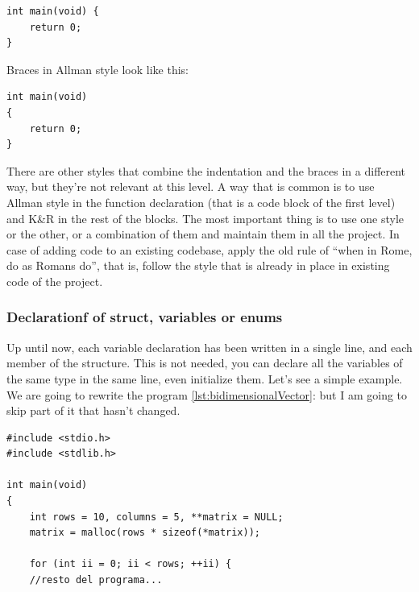 \documentclass[a4paper]{article}
\begin{document}
\noindent
\begin{minipage}[H]{\linewidth}
\mbox{}
\begin{lstlisting}[style=C,
caption={Example of braces in K\&R style},
label={lst:KRBrackets}]
int main(void) {
    return 0;
}
\end{lstlisting}
\end{minipage}

Braces in Allman style look like this:

\noindent
\begin{minipage}[H]{\linewidth}
\mbox{}
\begin{lstlisting}[style=C,
caption={Example of braces in Allman style},
label={lst:AllmanBrackets}]
int main(void)
{
    return 0;
}
\end{lstlisting}
\end{minipage}

There are other styles that combine the indentation and the braces in a
different way, but they're not relevant at this level. A way that is common is
to use Allman style in the function declaration (that is a code block of the
first level) and K\&R in the rest of the blocks. The most important thing is to
use one style or the other, or a combination of them and maintain them in all
the project. In case of adding code to an existing codebase, apply the old rule
of ``when in Rome, do as Romans do'', that is, follow the style that is already
in place in existing code of the project.

\subsubsection{Declarationf of struct, variables or enums}
Up until now, each variable declaration has been written in a single line, and
each member of the structure. This is not needed, you can declare all the
variables of the same type in the same line, even initialize them. Let's see a
simple example. We are going to rewrite the program
\ref{lst:bidimensionalVector}: 
but I am going to skip part of it that hasn't changed.

\noindent
\begin{minipage}[H]{\linewidth}
\mbox{}
\begin{lstlisting}[style=C,
caption={Declaration of variable in the same line},
label={lst:singleLineDeclaration}]
#include <stdio.h>
#include <stdlib.h>

int main(void)
{
    int rows = 10, columns = 5, **matrix = NULL;
    matrix = malloc(rows * sizeof(*matrix));

    for (int ii = 0; ii < rows; ++ii) {
    //resto del programa...
\end{lstlisting}
\end{minipage}
\end{document}
